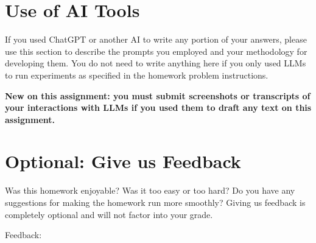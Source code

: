\documentclass[leqno,12pt]{article}
\begin{document}
\section{Use of AI Tools}
If you used ChatGPT or another AI to write any portion of your answers, please use this section to describe the prompts you employed and your methodology for developing them. You do not need to write anything here if you only used LLMs to run experiments as specified in the homework problem instructions.

\textbf{New on this assignment: you must submit screenshots or transcripts of your interactions with LLMs if you used them to draft any text on this assignment.}
\noindent
\begin{tcolorbox}[fit,height=10cm, width=\linewidth, blank, borderline={1pt}{-2pt}]
\end{tcolorbox}
\newpage
\section{Optional: Give us Feedback}

Was this homework enjoyable? Was it too easy or too hard? Do you have any suggestions for making the homework run more smoothly? Giving us feedback is completely optional and will not factor into your grade. \newline

\noindent
Feedback:
\begin{tcolorbox}[fit,height=10cm, width=\linewidth, blank, borderline={1pt}{-2pt}]
\end{tcolorbox}
\end{document}
